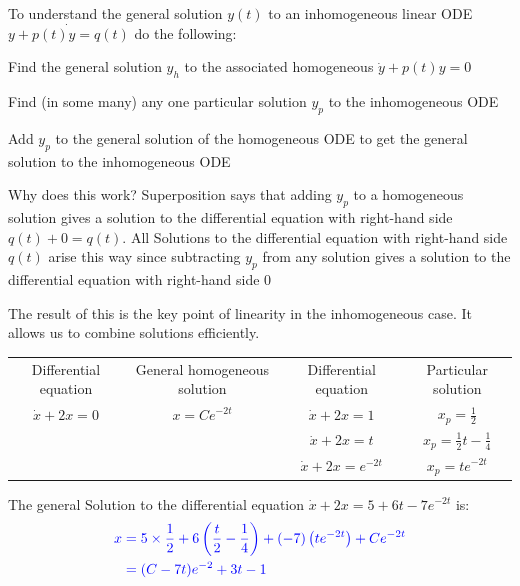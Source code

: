 \documentclass[11pt, openright]{book}
\begin{document}
To understand the general solution $y(t)$ to an inhomogeneous linear ODE $\dot{y+p(t)y=q(t)}$ do the following:
\begin{items}{-15pt}{-15pt}
    \item Find the general solution $y_h$ to the associated homogeneous $\dot{y}+p(t)y=0$
    \item Find (in some many) any one particular solution $y_p$ to the inhomogeneous ODE
    \item Add $y_p$ to the general solution of the homogeneous ODE to get the general solution to the inhomogeneous ODE
\end{items}


Why does this work? Superposition says that adding $y_p$ to a homogeneous solution gives a solution to the differential equation with right-hand side $q(t)+0=q(t)$. All Solutions to the differential equation with right-hand side $q(t)$ arise this way since subtracting $y_p$ from any solution gives a solution to the differential equation with right-hand side $0$

The result of this is the key point of linearity in the inhomogeneous case. It allows us to combine solutions efficiently.

\begin{dent}{}
    \begin{tabular}{c c|c c}
        Differential equation & General homogeneous solution & Differential equation & Particular solution            \\
        $\dot{x}+2x=0$        & $x=Ce^{-2t}$                 & $\dot{x}+2x=1$        & $x_p=\frac{1}{2}$              \\
                              &                              & $\dot{x}+2x=t$        & $x_p=\frac{1}{2}t-\frac{1}{4}$ \\
                              &                              & $\dot{x}+2x=e^{-2t}$  & $x_p=te^{-2t}$
    \end{tabular}

    The general Solution to the differential equation $\dot{x}+2x=5+6t-7e^{-2t}$ is:
    \vspace{-10pt}
    \begin{align*}
        \color{blue} x & \color{blue}=5\times\frac{1}{2}+6\left( \frac{t}{2}-\frac{1}{4} \right)+(-7)\left( te^{-2t} \right)+Ce^{-2t} \\
               & \color{blue}= (C-7t)e^{-2}+3t-1
    \end{align*}

\end{dent}
\end{document}

